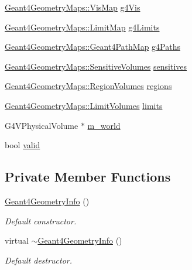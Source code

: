 \begin{DoxyCompactItemize}
\item 
\hyperlink{namespace_d_d4hep_1_1_simulation_1_1_geant4_geometry_maps_af7bb137248b77047dc34ff68d67225eb}{Geant4\+Geometry\+Maps\+::\+Vis\+Map} \hyperlink{class_d_d4hep_1_1_simulation_1_1_geant4_geometry_info_a1dc6d3c046072b0a6455c00e7fc76269}{g4\+Vis}
\item 
\hyperlink{namespace_d_d4hep_1_1_simulation_1_1_geant4_geometry_maps_a338013d6709b82358b8e2490cdba0ed2}{Geant4\+Geometry\+Maps\+::\+Limit\+Map} \hyperlink{class_d_d4hep_1_1_simulation_1_1_geant4_geometry_info_a6005f56c4ca13d015288ae645e58df69}{g4\+Limits}
\item 
\hyperlink{namespace_d_d4hep_1_1_simulation_1_1_geant4_geometry_maps_a3d68bbc4e8d7a581a15f66d773dac6e7}{Geant4\+Geometry\+Maps\+::\+Geant4\+Path\+Map} \hyperlink{class_d_d4hep_1_1_simulation_1_1_geant4_geometry_info_a526d06afb77ac403965f2bb6c55998de}{g4\+Paths}
\item 
\hyperlink{namespace_d_d4hep_1_1_simulation_1_1_geant4_geometry_maps_a4b4bd41ff250c41737c7a73223fab910}{Geant4\+Geometry\+Maps\+::\+Sensitive\+Volumes} \hyperlink{class_d_d4hep_1_1_simulation_1_1_geant4_geometry_info_ab8c6e7272ad7cf326e06e5ea1f200418}{sensitives}
\item 
\hyperlink{namespace_d_d4hep_1_1_simulation_1_1_geant4_geometry_maps_a9fc457ad93d6235197e7e1ab013d1f56}{Geant4\+Geometry\+Maps\+::\+Region\+Volumes} \hyperlink{class_d_d4hep_1_1_simulation_1_1_geant4_geometry_info_ad224a954b07a8662bb57f3ee0355cdfa}{regions}
\item 
\hyperlink{namespace_d_d4hep_1_1_simulation_1_1_geant4_geometry_maps_a3b9008449a71468a115373b9819457df}{Geant4\+Geometry\+Maps\+::\+Limit\+Volumes} \hyperlink{class_d_d4hep_1_1_simulation_1_1_geant4_geometry_info_a913c884fc30046a6eb65702d11f4383f}{limits}
\item 
G4\+V\+Physical\+Volume $\ast$ \hyperlink{class_d_d4hep_1_1_simulation_1_1_geant4_geometry_info_afac417dc2da0efb0dafa60863a56856f}{m\+\_\+world}
\item 
bool \hyperlink{class_d_d4hep_1_1_simulation_1_1_geant4_geometry_info_a0bc71f53d762f58ec47c76dc5db8b075}{valid}
\end{DoxyCompactItemize}
\subsection*{Private Member Functions}
\begin{DoxyCompactItemize}
\item 
\hyperlink{class_d_d4hep_1_1_simulation_1_1_geant4_geometry_info_a1da4666f8da102d02b986becb980dcb9}{Geant4\+Geometry\+Info} ()
\begin{DoxyCompactList}\small\item\em Default constructor. \end{DoxyCompactList}\item 
virtual \hyperlink{class_d_d4hep_1_1_simulation_1_1_geant4_geometry_info_ab6da85b84ee74c106b5d4713dc5ccaef}{$\sim$\+Geant4\+Geometry\+Info} ()
\begin{DoxyCompactList}\small\item\em Default destructor. \end{DoxyCompactList}\end{DoxyCompactItemize}
